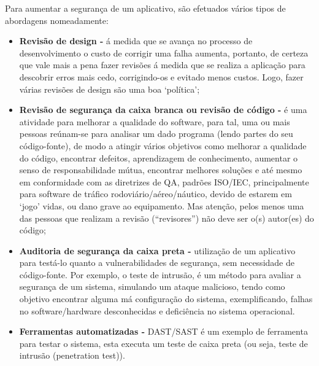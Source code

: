 \documentclass{report}
\begin{document}
Para aumentar a segurança de um aplicativo, são efetuados vários tipos de abordagens nomeadamente: 
\begin{itemize}
   \vspace{5mm} \item   \textbf{Revisão de design - }á medida que se avança no processo de desenvolvimento o custo de corrigir uma falha aumenta, portanto, de certeza que vale mais a pena fazer revisões á medida que se realiza a aplicação para descobrir erros mais cedo, corrigindo-os e evitado menos custos. Logo, fazer várias revisões de design são uma boa ‘política’;
    \vspace{5mm}\item   \textbf{Revisão de segurança da caixa branca ou revisão de código - }é uma atividade para melhorar a qualidade do software, para tal, uma ou mais pessoas reúnam-se para analisar um dado programa (lendo partes do seu código-fonte), de modo a atingir vários objetivos como melhorar a qualidade do código, encontrar defeitos, aprendizagem de conhecimento, aumentar o senso de responsabilidade mútua, encontrar melhores soluções e até mesmo em conformidade com as diretrizes de QA, padrões \ac{ISO/IEC}, principalmente para software de tráfico rodoviário/aéreo/náutico, devido de estarem em ‘jogo’ vidas, ou dano grave ao equipamento. Mas atenção, pelos menos uma das pessoas que realizam a revisão (“revisores”) não deve ser o(s) autor(es) do código;
   \vspace{5mm} \item    \textbf{Auditoria de segurança da caixa preta - }utilização de um aplicativo para testá-lo quanto a vulnerabilidades de segurança, sem necessidade de código-fonte. Por exemplo, o teste de intrusão, é um método para avaliar a segurança de um sistema, simulando um ataque malicioso, tendo como objetivo encontrar alguma má configuração do sistema, exemplificando, falhas no software/hardware desconhecidas e deficiência no sistema operacional.
   \vspace{5mm} \item    \textbf{Ferramentas automatizadas - }\ac{DAST/SAST} é um exemplo de ferramenta para testar o sistema, esta executa um teste de caixa preta (ou seja, teste de intrusão (penetration test)). 

\end{itemize}
\end{document}
